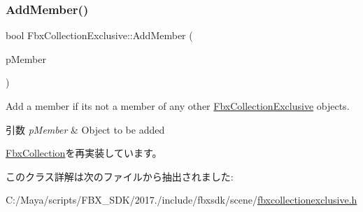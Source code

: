 \subsubsection{\texorpdfstring{Add\+Member()}{AddMember()}}
{\footnotesize\ttfamily bool Fbx\+Collection\+Exclusive\+::\+Add\+Member (\begin{DoxyParamCaption}\item[{\hyperlink{class_fbx_object}{Fbx\+Object} $\ast$}]{p\+Member }\end{DoxyParamCaption})\hspace{0.3cm}{\ttfamily [virtual]}}

Add a member if it\textquotesingle{}s not a member of any other \hyperlink{class_fbx_collection_exclusive}{Fbx\+Collection\+Exclusive} objects. 
\begin{DoxyParams}{引数}
{\em p\+Member} & Object to be added \\
\hline
\end{DoxyParams}


\hyperlink{class_fbx_collection_a8f9bfa57454dda20ef75dd4f27761a15}{Fbx\+Collection}を再実装しています。



このクラス詳解は次のファイルから抽出されました\+:\begin{DoxyCompactItemize}
\item 
C\+:/\+Maya/scripts/\+F\+B\+X\+\_\+\+S\+D\+K/2017./include/fbxsdk/scene/\hyperlink{fbxcollectionexclusive_8h}{fbxcollectionexclusive.\+h}\end{DoxyCompactItemize}
